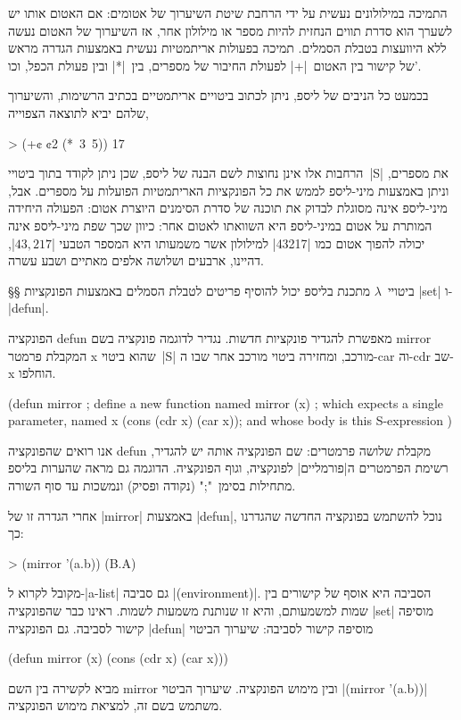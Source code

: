 התמיכה במילולונים נעשית על ידי הרחבת שיטת השיערוך של אטומים: אם האטום אותו יש
לשערך הוא סדרת תווים הנחזית להיות מספר או מילולון אחר, אז השיערוך של האטום נעשה
ללא היוועצות בטבלת הסמלים. תמיכה בפעולות אריתמטיות נעשית באמצעות הגדרה מראש של
קישור בין האטום~\T|+| לפעולת החיבור של מספרים, בין~\T|*| ובין פעולת הכפל,
וכו'.

בכמעט כל הניבים של ליספ, ניתן לכתוב ביטויים אריתמטיים בכתיב הרשימות, והשיערוך
שלהם יביא לתוצאה הצפוייה,

\begin{LISP}
> (+¢ ¢2 (*~3~5))
17
\end{LISP}

הרחבות אלו אינן נחוצות לשם הבנה של ליספ, שכן ניתן לקודד בתוך ביטויי~\E|S| את
מספרים, וניתן באמצעות מיני-ליספ לממש את כל הפונקציות האריתמטיות הפועלות על
מספרים. אבל, מיני-ליספ אינה מסוגלת לבדוק את תוכנה של סדרת הסימנים היוצרת אטום:
הפעולה היחידה המותרת על אטום במיני-ליספ היא השוואתו לאטום אחר: כיוון שכך שפת
מיני-ליספ אינה יכולה להפוך אטום כמו \T|43217| למילולון אשר משמעותו היא המספר
הטבעי \E|$43,217$|, דהיינו, ארבעים ושלושה אלפים מאתיים ושבע עשרה.

§§ ביטויי~$λ$
מתכנת בליספ יכול להוסיף פריטים לטבלת הסמלים באמצעות הפונקציות \E|set|
ו-\E|defun|.

הפונקציה defun מאפשרת להגדיר פונקציות חדשות. נגדיר לדוגמה פונקציה בשם mirror
המקבלת פרמטר x שהוא ביטוי~\E|S| מורכב, ומחזירה ביטוי מורכב אחר שבו ה-car וה-cdr
שב-x הוחלפו.
\begin{LISP}
(defun mirror ; define a new function named mirror
  (x) ; which expects a single parameter, named x
  (cons (cdr x) (car x)); and whose body is this S-expression
)
\end{LISP}
אנו רואים שהפונקציה defun מקבלת שלושה פרמטרים: שם הפונקציה אותה יש להגדיר,
רשימת הפרמטרים ה\ע|פורמליים| לפונקציה, וגוף הפונקציה. הדוגמה גם מראה שהערות
בליספ מתחילות בסימן~";" (נקודה ופסיק) ונמשכות עד סוף השורה.

אחרי הגדרה זו של \E|mirror| באמצעות \E|defun|, נוכל להשתמש בפונקציה החדשה
שהגדרנו כך:
\begin{LISP}
> (mirror '(a.b))
(B.A)
\end{LISP}

מקובל לקרוא ל-\E|a-list| גם סביבה \E|(environment)|. הסביבה היא אוסף של קישורים
בין שמות למשמעותם, והיא זו שנותנת משמעות לשמות. ראינו כבר שהפונקציה \E|set|
מוסיפה קישור לסביבה. גם הפונקציה \E|defun| מוסיפה קישור לסביבה: שיערוך הביטוי
\begin{LISP}
(defun mirror (x) (cons (cdr x) (car x)))
\end{LISP}
מביא לקשירה בין השם mirror ובין מימוש הפונקציה. שיערוך הביטוי \T|(mirror
'(a.b))| משתמש בשם זה, למציאת מימוש הפונקציה.

